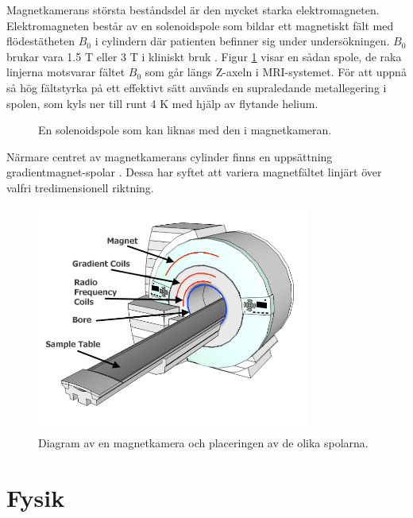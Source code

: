 \documentclass[11pt, a4paper]{article}
\begin{document}
Magnetkamerans största beståndsdel är den mycket starka elektromagneten. Elektromagneten består av en solenoidspole som bildar ett magnetiskt fält med flödestätheten $B_0$ i cylindern där patienten befinner sig under undersökningen. $B_0$ brukar vara 1.5 T eller 3 T i kliniskt bruk \parencite{understanding_mri}. Figur \ref{fig:solenoid} visar en sådan spole, de raka linjerna motsvarar fältet $B_0$ som går längs Z-axeln i MRI-systemet. För att uppnå så hög fältstyrka på ett effektivt sätt används en supraledande metallegering i spolen, som kyls ner till runt 4 K	med hjälp av flytande helium. 

\begin{figure}[hp]
	\centering
	
	\caption{En solenoidspole som kan liknas med den i magnetkameran.}
	\label{fig:solenoid}
\end{figure}

Närmare centret av magnetkamerans cylinder finns en uppsättning gradient\-magnet-spolar . Dessa har syftet att variera magnetfältet linjärt över valfri tredimensionell riktning. 

\begin{figure}[hp]
	\centering
	\includegraphics[width=0.8\textwidth]{mri_schematic}
	\caption{Diagram av en magnetkamera och placeringen av de olika spolarna.}
\end{figure}

\section{Fysik}

\end{document}
